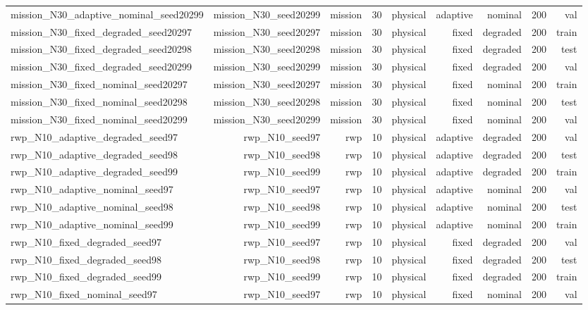 \begin{tabular}{lrrrrrrrr}
mission\_N30\_adaptive\_nominal\_seed20299 & mission\_N30\_seed20299 & mission & 30 & physical & adaptive & nominal & 200 & val \\
mission\_N30\_fixed\_degraded\_seed20297 & mission\_N30\_seed20297 & mission & 30 & physical & fixed & degraded & 200 & train \\
mission\_N30\_fixed\_degraded\_seed20298 & mission\_N30\_seed20298 & mission & 30 & physical & fixed & degraded & 200 & test \\
mission\_N30\_fixed\_degraded\_seed20299 & mission\_N30\_seed20299 & mission & 30 & physical & fixed & degraded & 200 & val \\
mission\_N30\_fixed\_nominal\_seed20297 & mission\_N30\_seed20297 & mission & 30 & physical & fixed & nominal & 200 & train \\
mission\_N30\_fixed\_nominal\_seed20298 & mission\_N30\_seed20298 & mission & 30 & physical & fixed & nominal & 200 & test \\
mission\_N30\_fixed\_nominal\_seed20299 & mission\_N30\_seed20299 & mission & 30 & physical & fixed & nominal & 200 & val \\
rwp\_N10\_adaptive\_degraded\_seed97 & rwp\_N10\_seed97 & rwp & 10 & physical & adaptive & degraded & 200 & val \\
rwp\_N10\_adaptive\_degraded\_seed98 & rwp\_N10\_seed98 & rwp & 10 & physical & adaptive & degraded & 200 & test \\
rwp\_N10\_adaptive\_degraded\_seed99 & rwp\_N10\_seed99 & rwp & 10 & physical & adaptive & degraded & 200 & train \\
rwp\_N10\_adaptive\_nominal\_seed97 & rwp\_N10\_seed97 & rwp & 10 & physical & adaptive & nominal & 200 & val \\
rwp\_N10\_adaptive\_nominal\_seed98 & rwp\_N10\_seed98 & rwp & 10 & physical & adaptive & nominal & 200 & test \\
rwp\_N10\_adaptive\_nominal\_seed99 & rwp\_N10\_seed99 & rwp & 10 & physical & adaptive & nominal & 200 & train \\
rwp\_N10\_fixed\_degraded\_seed97 & rwp\_N10\_seed97 & rwp & 10 & physical & fixed & degraded & 200 & val \\
rwp\_N10\_fixed\_degraded\_seed98 & rwp\_N10\_seed98 & rwp & 10 & physical & fixed & degraded & 200 & test \\
rwp\_N10\_fixed\_degraded\_seed99 & rwp\_N10\_seed99 & rwp & 10 & physical & fixed & degraded & 200 & train \\
rwp\_N10\_fixed\_nominal\_seed97 & rwp\_N10\_seed97 & rwp & 10 & physical & fixed & nominal & 200 & val \\

\end{tabular}
